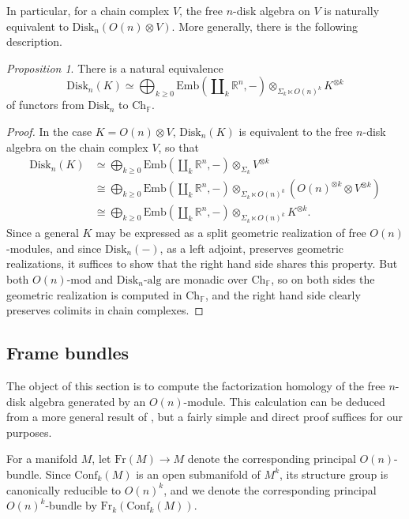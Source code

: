 \documentclass{compositio}
\theoremstyle{definition}\newtheorem{definition}{Definition}[section]
\theoremstyle{theorem}\newtheorem{lemma}[definition]{Lemma}
\theoremstyle{remark}\newtheorem*{conventions}{Conventions}
\theoremstyle{remark}\newtheorem*{acknowledgments}{Acknowledgments}
\theoremstyle{remark}\newtheorem*{outline}{Outline}
\theoremstyle{remark}\newtheorem*{questions}{Questions}
\theoremstyle{remark}\newtheorem{example}[definition]{Example}
\theoremstyle{definition}\newtheorem{construction}[definition]{Construction}
\theoremstyle{definition}\newtheorem*{convention}{Convention}
\theoremstyle{definition}\newtheorem*{conjecture}{Conjecture}
\theoremstyle{theorem}\newtheorem{theorem}[definition]{Theorem}
\theoremstyle{theorem}\newtheorem{paradigm}[definition]{Paradigm}
\theoremstyle{remark}\newtheorem{remark}[definition]{Remark}
\theoremstyle{corollary}\newtheorem{corollary}[definition]{Corollary}
\theoremstyle{theorem}\newtheorem{proposition}[definition]{Proposition}
\theoremstyle{definition}\newtheorem{question}[definition]{Question}
\begin{document}
In particular, for a chain complex $V$, the free $n$-disk algebra on $V$ is naturally equivalent to ${\mathrm{Disk}}_n(O(n)\otimes V).$ More generally, there is the following description.

\begin{proposition}
There is a natural equivalence $${\mathrm{Disk}}_n(K)\simeq\bigoplus_{k\geq0}{\mathrm{Emb}}(\amalg_k\mathbb{R}^n,-)\otimes_{\Sigma_k\ltimes O(n)^k}K^{\otimes k}$$ of functors from ${\mathrm{Disk}}_n$ to ${\mathrm{Ch}}_\mathbb{F}$.
\end{proposition}
\begin{proof}
In the case $K=O(n)\otimes V$, ${\mathrm{Disk}}_n(K)$ is equivalent to the free $n$-disk algebra on the chain complex $V$, so that \begin{align*}{\mathrm{Disk}}_n(K)&\simeq\bigoplus_{k\geq0}{\mathrm{Emb}}(\amalg_k\mathbb{R}^n,-)\otimes_{\Sigma_k}V^{\otimes k}\\
&\cong\bigoplus_{k\geq0}{\mathrm{Emb}}(\amalg_k\mathbb{R}^n,-)\otimes_{\Sigma_k\ltimes O(n)^k}(O(n)^{\otimes k}\otimes V^{\otimes k})\\
&\cong\bigoplus_{k\geq0}{\mathrm{Emb}}(\amalg_k\mathbb{R}^n,-)\otimes_{\Sigma_k\ltimes O(n)^k}K^{\otimes k}.
\end{align*} Since a general $K$ may be expressed as a split geometric realization of free $O(n)$-modules, and since ${\mathrm{Disk}}_n(-)$, as a left adjoint, preserves geometric realizations, it suffices to show that the right hand side shares this property. But both $O(n)\text{-}\mathrm{mod}$ and ${\mathrm{Disk}}_n\text{-}\mathrm{alg}$ are monadic over ${\mathrm{Ch}}_\mathbb{F}$, so on both sides the geometric realization is computed in ${\mathrm{Ch}}_\mathbb{F}$, and the right hand side clearly preserves colimits in chain complexes.
\end{proof}

\subsection{Frame bundles}\label{free algebras}

The object of this section is to compute the factorization homology of the free $n$-disk algebra generated by an $O(n)$-module. This calculation can be deduced from a more general result of \cite{AF}, but a fairly simple and direct proof suffices for our purposes.

For a manifold $M$, let ${\mathrm{Fr}}(M)\to M$ denote the corresponding principal $O(n)$-bundle. Since ${\mathrm{Conf}}_k(M)$ is an open submanifold of $M^k$, its structure group is canonically reducible to $O(n)^k$, and we denote the corresponding principal $O(n)^k$-bundle by ${\mathrm{Fr}}_k({\mathrm{Conf}}_k(M))$.
\end{document}
